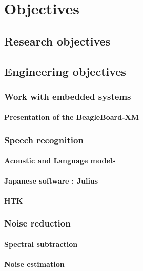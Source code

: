 \section{Objectives}
\subsection{Research objectives}
\subsection{Engineering objectives}
\subsubsection{Work with embedded systems}
\paragraph{Presentation of the BeagleBoard-XM}
\subsubsection{Speech recognition}
\paragraph{Acoustic and Language models}
\paragraph{Japanese software : Julius}
\paragraph{\ac{HTK}}
\subsubsection{Noise reduction}
\paragraph{Spectral subtraction}
\paragraph{Noise estimation}